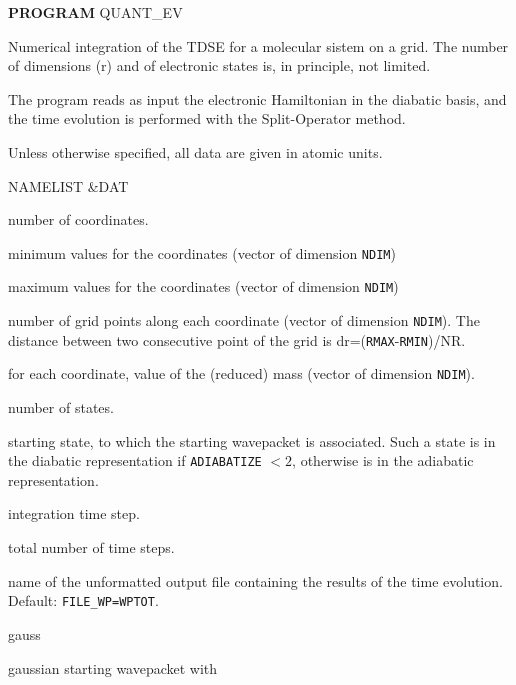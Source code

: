 \documentclass[12pt,fleqn]{article}
\newcommand{\Nomeprog}{\sf QUANT\_EV}
\begin{document}
 
\begin{center}
  \large \textbf{PROGRAM} \Nomeprog
\end{center}

Numerical integration of the TDSE for a molecular sistem on a grid. 
The number of dimensions (r) and of electronic states is, in principle, not
limited.

The program reads as input the electronic Hamiltonian in the diabatic basis,
and the time evolution is performed with the Split-Operator method.

Unless otherwise specified, all data are given in atomic units.

\begin{labeling}{NAMELIST \&DAT}
  \setlength{\itemsep}{-0.7ex}
  \item[NAMELIST \&DAT]
  \item[NDIM]  number of coordinates.
  \item[RMIN]  minimum values for the coordinates (vector of dimension \texttt{NDIM})
  \item[RMAX]  maximum values for the coordinates (vector of dimension \texttt{NDIM})
  \item[NR]  number of grid points along each coordinate (vector of dimension \texttt{NDIM}). The distance between
    two consecutive point of the grid is dr=(\texttt{RMAX}-\texttt{RMIN})/NR.
  \item[MASSA]  for each coordinate, value of the (reduced) mass (vector of dimension \texttt{NDIM}).
  \item[NSTATI]  number of states.
  \item[ISTATI]  starting state, to which the starting wavepacket is associated. Such a state is in the
    diabatic representation if \texttt{ADIABATIZE} $<2$, otherwise is in the adiabatic representation.
  \item[TIME]  integration time step.
  \item[TCYCLES]  total number of time steps.
  \item[FILE\_WP]  name of the unformatted output file containing the results of the time evolution.
    Default: \texttt{FILE\_WP=WPTOT}.
  \item[WPACK]  \begin{labeling}{gauss}
                       \setlength{\itemsep}{-1ex}
                       \item[gauss]  gaussian starting wavepacket with
                         \begin{align*}

\end{align*}
\end{labeling}
\end{labeling}
\end{document}
